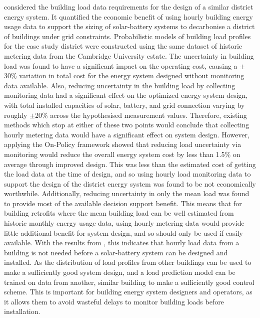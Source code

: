  considered the building load data requirements for the design of a similar district energy system. It quantified the economic benefit of using hourly building energy usage data to support the sizing
of solar-battery systems to decarbonise a district of buildings under grid constraints. Probabilistic models of building load profiles for the case study district were constructed using the same dataset of historic metering data from the Cambridge University estate.
The uncertainty in building load was found to have a significant impact on the operating cost, causing a $\pm$30\% variation in total cost for the energy system designed without monitoring data available. Also, reducing uncertainty in the building load by collecting monitoring data had a significant effect on the optimized energy system design, with total installed capacities of solar, battery, and grid connection varying by roughly $\pm$20\% across the hypothesised measurement values. Therefore, existing methods which stop at either of these two points would conclude that collecting hourly metering data would have a significant effect on system design.
However, applying the On-Policy  framework showed that reducing load uncertainty via monitoring would reduce the overall energy system cost by less than 1.5\% on average through improved design. This was less than the estimated cost of getting the load data at the time of design, and so using hourly load monitoring data to support the design of the district energy system was found to be not economically worthwhile.
Additionally, reducing uncertainty in only the mean load was found to provide most of the available decision support benefit. This means that for building retrofits where the mean building load can be well estimated from historic monthly energy usage data, using hourly metering data would provide little additional benefit for system design, and so should only be used if easily available.
With the results from , this indicates that hourly load data from a building is not needed before a solar-battery system can be designed and installed. As the distribution of load profiles from other buildings can be used to make a sufficiently good system design, and a load prediction model can be trained on data from another, similar building to make a sufficiently good control scheme.
This is important for building energy system designers and operators, as it allows them to avoid wasteful delays to monitor building loads before installation.

